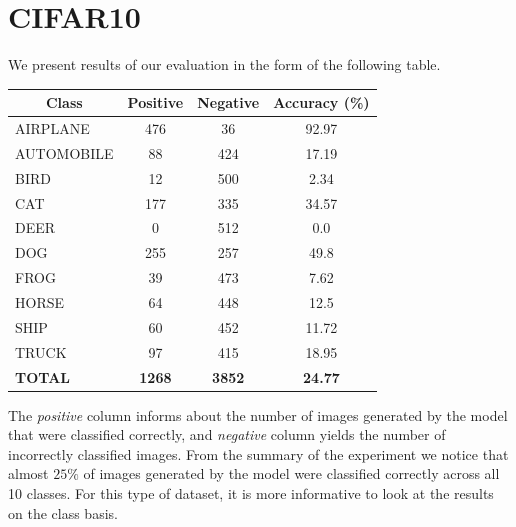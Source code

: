 \documentclass[11pt,a4paper,openany]{book}
\begin{document}
\section{CIFAR10}
\noindent We present results of our evaluation in the form of the following table. \\
\begin{table}[h!]
\centering
\begin{tabular}{|l|c|c|c|}
\hline
\multicolumn{1}{|c|}{\textbf{Class}} & \textbf{Positive} & \textbf{Negative} & \textbf{Accuracy (\%)}       \\ \hline
AIRPLANE                             & 476               & 36                & {\color[HTML]{32CB00} 92.97} \\ \hline
AUTOMOBILE                           & 88                & 424               & 17.19                        \\ \hline
BIRD                                 & 12                & 500               & 2.34                         \\ \hline
CAT                                  & 177               & 335               & 34.57                        \\ \hline
DEER                                 & 0                 & 512               & {\color[HTML]{FE0000} 0.0}   \\ \hline
DOG                                  & 255               & 257               & 49.8                         \\ \hline
FROG                                 & 39                & 473               & 7.62                         \\ \hline
HORSE                                & 64                & 448               & 12.5                         \\ \hline
SHIP                                 & 60                & 452               & 11.72                        \\ \hline
TRUCK                                & 97                & 415               & 18.95                        \\ \hline
\textbf{TOTAL}                       & \textbf{1268}     & \textbf{3852}     & \textbf{24.77}               \\ \hline
\end{tabular}
\end{table}
\newline
\noindent The \textit{positive} column informs about the number of images generated by the model that were classified correctly, and \textit{negative} column yields the number of incorrectly classified images. From the summary of the experiment we notice that almost $25\%$ of images generated by the model were classified correctly across all 10 classes. For this type of dataset, it is more informative to look at the results on the class basis.
\end{document}
